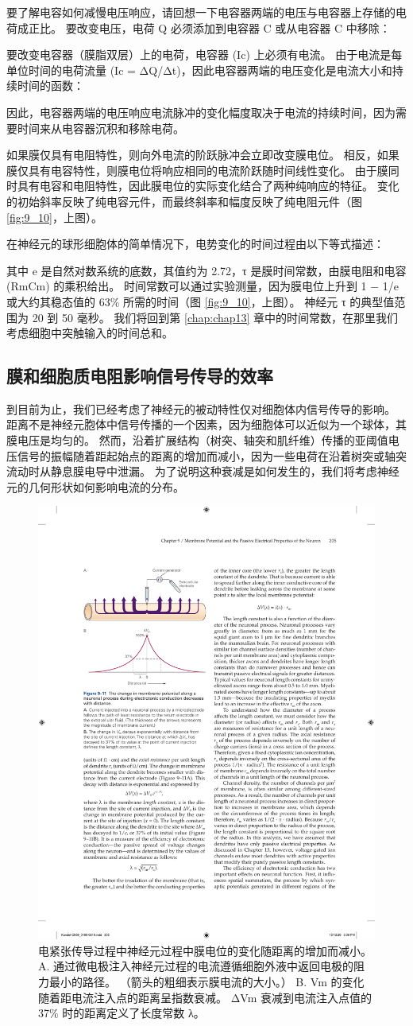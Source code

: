 要了解电容如何减慢电压响应，请回想一下电容器两端的电压与电容器上存储的电荷成正比。 
要改变电压，电荷 Q 必须添加到电容器 C 或从电容器 C 中移除：


要改变电容器（膜脂双层）上的电荷，电容器 (Ic) 上必须有电流。 
由于电流是每单位时间的电荷流量 (Ic = ΔQ/Δt)，因此电容器两端的电压变化是电流大小和持续时间的函数：


因此，电容器两端的电压响应电流脉冲的变化幅度取决于电流的持续时间，因为需要时间来从电容器沉积和移除电荷。


如果膜仅具有电阻特性，则向外电流的阶跃脉冲会立即改变膜电位。 
相反，如果膜仅具有电容特性，则膜电位将响应相同的电流阶跃随时间线性变化。 
由于膜同时具有电容和电阻特性，因此膜电位的实际变化结合了两种纯响应的特征。 
变化的初始斜率反映了纯电容元件，而最终斜率和幅度反映了纯电阻元件（图 \ref{fig:9_10}，上图）。


在神经元的球形细胞体的简单情况下，电势变化的时间过程由以下等式描述：


其中 e 是自然对数系统的底数，其值约为 2.72，τ 是膜时间常数，由膜电阻和电容 (RmCm) 的乘积给出。
时间常数可以通过实验测量，因为膜电位上升到 1 − 1/e 或大约其稳态值的 63\% 所需的时间（图 \ref{fig:9_10}，上图）。 
神经元 τ 的典型值范围为 20 到 50 毫秒。 我们将回到第 \ref{chap:chap13} 章中的时间常数，在那里我们考虑细胞中突触输入的时间总和。



\subsection{膜和细胞质电阻影响信号传导的效率}
到目前为止，我们已经考虑了神经元的被动特性仅对细胞体内信号传导的影响。 
距离不是神经元胞体中信号传播的一个因素，因为细胞体可以近似为一个球体，其膜电压是均匀的。 
然而，沿着扩展结构（树突、轴突和肌纤维）传播的亚阈值电压信号的振幅随着距起始点的距离的增加而减小，因为一些电荷在沿着树突或轴突流动时从静息膜电导中泄漏。 
为了说明这种衰减是如何发生的，我们将考虑神经元的几何形状如何影响电流的分布。


\begin{figure}[htbp]
	\centering
	\includegraphics[width=0.5\linewidth]{chap09/fig_9_11}
	\caption{电紧张传导过程中神经元过程中膜电位的变化随距离的增加而减小。 A. 通过微电极注入神经元过程的电流遵循细胞外液中返回电极的阻力最小的路径。 （箭头的粗细表示膜电流的大小。） B. Vm 的变化随着距电流注入点的距离呈指数衰减。 ΔVm 衰减到电流注入点值的 37\% 时的距离定义了长度常数 λ。}
	\label{fig:9_11}
\end{figure}

